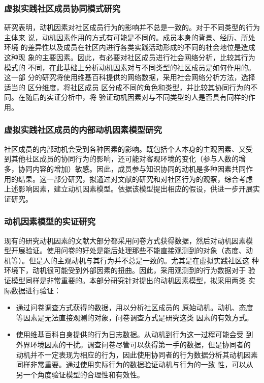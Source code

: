 \documentclass[12pt,a4paper,cs4size]{ctexart}
\begin{document}
\subsubsection{虚拟实践社区成员协同模式研究}
研究表明，动机因素对社区成员行为的影响并不总是一致的。对于不同类型的行为主体来
说，动机因素作用的方式有可能是不同的。成员本身的背景、经历、所处环境
的差异性以及成员在社区内进行各类实践活动形成的不同的社会地位是造成这种现
象的主要因素。因此，有必要对社区成员进行社会网络分析，比较其行为模式的
不同，在此基础上分析动机因素对与不同类型的社区成员是如何作用的。这一部
分的研究将使用维基百科提供的网络数据，采用社会网络分析方法，选择适当的
区分维度，将社区成员
区分成不同的角色和类型，并比较其协同行为的不同。在随后的实证分析中，将
验证动机因素对与不同类型的人是否具有同样的作用。

\subsubsection{虚拟实践社区成员的内部动机因素模型研究}
社区成员的内部动机会受到各种因素的影响。既包括个人本身的主观因素、又受
到其他社区成员的协同行为的影响，还可能对客观环境的变化（参与人数的增
多，协同内容的增加）敏感。因此，成员参与知识协同的动机是多种因素共同作
用的结果。这一部分研究，拟通过对文献的研究和对社区行为的观察，综合考虑
上述影响因素，建立动机因素模型。依据该模型提出相应的假设，供进一步开展实证研究。


\subsubsection{动机因素模型的实证研究}
现有的研究动机因素的文献大部分都采用问卷方式获得数据，然后对动机因素模
型开展验证。使用问卷的好处是能后处理那些不能直接观测到的对象（态度、动
机等）。但是人的主观动机与其行为并不总是一致的。尤其是在虚拟实践社区这
种环境下，动机很可能受到外部因素的扭曲。因此，采用观测到的行为数据对于
验证模型同样是非常重要的。本部分研究针对提出的动机因素模型，拟采用两类
实际数据进行验证：
\begin{itemize}
\item 通过问卷调查方式获得的数据，用以分析社区成员的
原始动机。动机、态度等因素是无法直接观测的对象，问卷调查方式是研究这类
因素的有效方式。
\item 使用维基百科自身提供的行为日志数据。从动机到行为这一过程可能会受
  到外界环境因素的干扰。调查问卷尽管可以获得第一手的数据，但是协同者的
  动机并不一定表现为相应的行为，因此使用协同者的行为数据分析其动机因素同样非常重要。通过使用实际行为的数据验证动机与行为的一致
性，可以从另一个角度验证模型的合理性和有效性。
\end{itemize}
\end{document}
